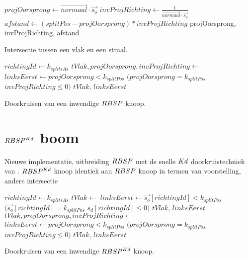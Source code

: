 \begin{dutchalgorithm}
    \begin{algorithmic}       
            \State $projOorsprong \gets \vec{normaal} \cdot \vec{s_o}$
            \State $invProjRichting \gets \frac{1}{\vec{normaal} \cdot \vec{s_d}}$
            \State $afstand \gets (splitPos - projOorsprong) * invProjRichting $
            \State \Return projOorsprong, invProjRichting, afstand
        \EndFunction
    \end{algorithmic}
    \caption{Intersectie tussen een vlak en een straal.}
\end{dutchalgorithm}

\begin{dutchalgorithm}
    \begin{algorithmic}       
            \State $richtingId \gets k_{splitsAs}$
            \State $tVlak, projOorsprong, invProjRichting \gets $ 
            \State $linksEerst \gets projOorsprong < k_{splitPos}$ \Or $(projOorsprong = k_{splitPos}$ \And $invProjRichting \leq 0)$
            \State \Return $tVlak$, $linksEerst$
        \EndFunction
    \end{algorithmic}
    \caption{Doorkruisen van een inwendige $RBSP$ knoop.}
\end{dutchalgorithm}

\section{$RBSP^{Kd}$ boom}
\label{sec:h4-rbspkd}
Nieuwe implementatie, uitbreiding $RBSP$ met de snelle $Kd$ doorkruistechniek van \authorIze{}.
$RBSP^{Kd}$ knoop identiek aan $RBSP$ knoop in termen van voorstelling, andere intersectie

\begin{dutchalgorithm}
    \begin{algorithmic}       
            \State $richtingId \gets k_{splitsAs}$
                \State $tVlak \gets $ 
                \State $linksEerst \gets \vec{s_o}[richtingId] < k_{splitPos}$ \Or $(\vec{s_o}[richtingId] = k_{splitPos}$ \And $s_d[richtingId] \leq 0)$
                \State \Return $tVlak$, $linksEerst$
            \Else
                \State $tVlak, projOorsprong, invProjRichting \gets $ 
                 \State $linksEerst \gets projOorsprong < k_{splitPos}$ \Or $(projOorsprong = k_{splitPos}$ \And $invProjRichting \leq 0)$
                \State \Return $tVlak$, $linksEerst$
            \EndIf
        \EndFunction
    \end{algorithmic}
    \caption{Doorkruisen van een inwendige $RBSP^{Kd}$ knoop.}
\end{dutchalgorithm}

